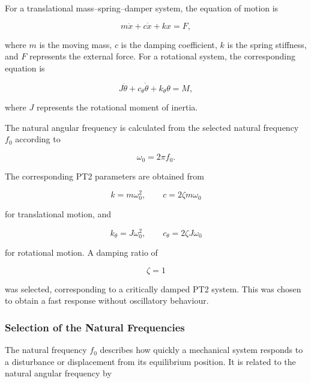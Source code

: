 	For a translational mass--spring--damper system, the equation of motion is
	
	\begin{equation}
		m\ddot{x}+c\dot{x}+kx=F,
	\end{equation}
	
	where $m$ is the moving mass, $c$ is the damping coefficient, $k$ is the spring stiffness, and $F$ represents the external force. For a rotational system, the corresponding equation is
	
	\begin{equation}
		J\ddot{\theta}+c_\theta\dot{\theta}
		+k_\theta\theta=M,
	\end{equation}
	
	where $J$ represents the rotational moment of inertia.
	
	The natural angular frequency is calculated from the selected natural frequency $f_0$ according to
	
	\begin{equation}
		\omega_0=2\pi f_0.
	\end{equation}
	
	The corresponding PT2 parameters are obtained from
	
	\begin{equation}
		k=m\omega_0^2,
		\qquad
		c=2\zeta m\omega_0
	\end{equation}
	
	for translational motion, and
	
	\begin{equation}
		k_\theta=J\omega_0^2,
		\qquad
		c_\theta=2\zeta J\omega_0
	\end{equation}
	
	for rotational motion. A damping ratio of
	
	\begin{equation}
		\zeta=1
	\end{equation}
	
	was selected, corresponding to a critically damped PT2 system. This was chosen to obtain a fast response without oscillatory behaviour.
	
	\subsubsection{Selection of the Natural Frequencies}
	
	The natural frequency $f_0$ describes how quickly a mechanical system responds to a disturbance or displacement from its equilibrium position. It is related to the natural angular frequency by
	
